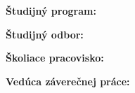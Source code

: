 \begin{titlepage}
\begingroup
\singlespacing
\centering

\vspace*{8mm}
{\Large\bfseries \MakeUppercase{\UniversityName}\par}
\vspace{2mm}
{\Large\bfseries \MakeUppercase{\FacultyName}\par}

\vfill

{\LARGE\bfseries \ThesisTitleSK\par}
\vspace{8mm}
\ifx\ThesisSubtitleSK\empty
\else
{\Large \ThesisSubtitleSK\par}
\vspace{8mm}
\fi
{\large \WorkTypeSK\par}

\vspace{10mm}

\begin{flushleft}
\textbf{Študijný program:} \StudyProgramName\par
\vspace{2mm}
\textbf{Študijný odbor:} \StudyFieldName\par
\vspace{2mm}
\textbf{Školiace pracovisko:} \DepartmentName\par
\vspace{2mm}
\textbf{Vedúca záverečnej práce:} \SupervisorName\par
\end{flushleft}

\vfill
\noindent
\begin{minipage}[t]{0.58\textwidth}
\raggedright
\PlaceName\ \SubmissionYear
\end{minipage}
\begin{minipage}[t]{0.40\textwidth}
\raggedleft
\AuthorName
\end{minipage}

\endgroup
\end{titlepage}
